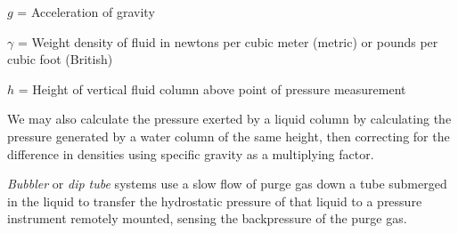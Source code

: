 $g$ = Acceleration of gravity

$\gamma$ = Weight density of fluid in newtons per cubic meter (metric) or pounds per cubic foot (British)

$h$ = Height of vertical fluid column above point of pressure measurement

\vskip 10pt

We may also calculate the pressure exerted by a liquid column by calculating the pressure generated by a water column of the same height, then correcting for the difference in densities using specific gravity as a multiplying factor.

\vskip 10pt

{\it Bubbler} or {\it dip tube} systems use a slow flow of purge gas down a tube submerged in the liquid to transfer the hydrostatic pressure of that liquid to a pressure instrument remotely mounted, sensing the backpressure of the purge gas.




